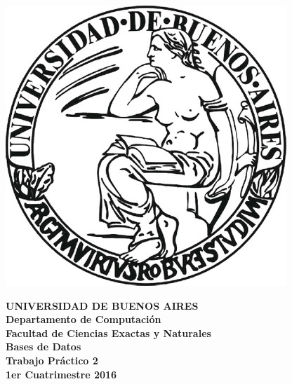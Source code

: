 \documentclass[11pt,a4paper]{article}
\begin{document}

\def\Materia{Bases de Datos}
\def\Titulo{Trabajo Pr\'{a}ctico 2}
\def\Fecha{1er Cuatrimestre 2016}

\thispagestyle{empty}

\begin{center}
	\includegraphics[scale = 0.25]{imagenes/logo_uba.jpg}
\end{center}

\begin{center}
	{\textbf{\large UNIVERSIDAD DE BUENOS AIRES}}\\[1.5em]
	{\textbf{\large Departamento de Computaci\'{o}n}}\\[1.5em]
    {\textbf{\large Facultad de Ciencias Exactas y Naturales}}\\
    \vspace{35mm}
    {\LARGE\textbf{\Materia}}\\[1em]    
    \vspace{15mm}
    {\Large \textbf{\Titulo}}\\[1em]
    \vspace{15mm}
    {\textbf{\Large \Fecha}}\\
    \vspace{15mm}
    \textbf{\tablaints}
\end{center}

\newpage
\thispagestyle{empty}
\tableofcontents

\parskip=5pt
\setlength{\parindent}{0pt}

\newpage
\setcounter{page}{1}
\pagestyle{plain}


\newpage

\newpage

\newpage

\newpage

\newpage
\end{document}
